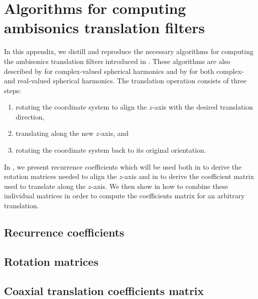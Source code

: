 \chapter{Algorithms for computing ambisonics translation filters}\label{chap:A1_Navigation_Filters}
In this appendix, we distill and reproduce the necessary algorithms for computing the ambisonics translation filters introduced in .
These algorithms are also described by \citet[chapter 3]{GumerovDuraiswami2005} for complex-valued spherical harmonics and by \citet[chapter III]{Zotter2009PhD} for both complex- and real-valued spherical harmonics.
The translation operation consists of three steps:
\begin{enumerate}
\item rotating the coordinate system to align the $z$-axis with the desired translation direction,
\item translating along the new $z$-axis, and
\item rotating the coordinate system back to its original orientation.
\end{enumerate}
In , we present recurrence coefficients which will be used both
in  to derive the rotation matrices needed to align the $z$-axis and
in  to derive the coefficient matrix used to translate along the $z$-axis.
We then show in  how to combine these individual matrices in order to compute the coefficients matrix for an arbitrary translation.

\section{Recurrence coefficients}\label{sec:A1_Navigation_Filters:Recurrence_Coefficients}


\section{Rotation matrices}\label{sec:A1_Navigation_Filters:Rotation_Matrices}


\section{Coaxial translation coefficients matrix}\label{sec:A1_Navigation_Filters:Coaxial_Filters}


